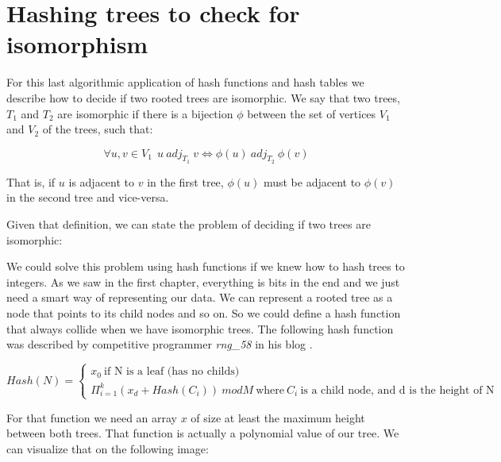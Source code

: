 \section{Hashing trees to check for isomorphism}

For this last algorithmic application of hash functions and hash tables we describe how to decide if two rooted trees are isomorphic. We say that two trees,  \( T_1 \) and \( T_2 \) are isomorphic if there is a bijection \( \phi \) between the set of vertices \(V_1 \) and \(V_2\) of the trees, such that:

\[ \forall u, v \in V_1~ ~ u ~adj_{T_1} ~v \iff \phi(u) ~adj_{T_2} ~\phi(v) \]

That is, if \(u \) is adjacent to \( v \) in the first tree, \( \phi(u) \) must be adjacent to \( \phi(v) \) in the second tree and vice-versa.

Given that definition, we can state the problem of deciding if two trees are isomorphic:

\medskip


\medskip

We could solve this problem using hash functions if we knew how to hash trees to integers. As we saw in the first chapter, everything is bits in the end and we just need a smart way of representing our data. We can represent a rooted tree as a node that points to its child nodes and so on. So we could define a hash function that always collide when we have isomorphic trees. The following hash function was described by competitive programmer \textit{rng\_58} in his blog \citep{TreeIsomorphism}.


\[ Hash(N) = \begin{cases} x_0 ~\text{if N is a leaf (has no childs)} \\
    \Pi_{i = 1}^{k} (x_d + Hash(C_i)) ~mod M ~\text{where} ~C_i ~\text{is a child node, and d is the height of N}
  \end{cases} \]

For that function we need an array \( x \) of size at least the maximum height between both trees. That function is actually a polynomial value of our tree. We can visualize that on the following image:

